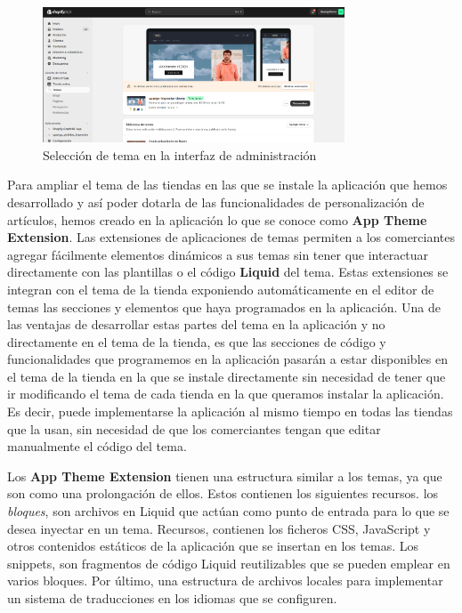 \documentclass[12pt]{article}
\begin{document}
\begin{figure}[ht]
    \centering
    \includegraphics[width=0.8\textwidth]{imagenes/Interfaz de adminsitración elección de tema.png}
    \caption{\label{fig:2}Selección de tema en la interfaz de administración}
    \vspace{\fill}
\end{figure}

Para ampliar el tema de las tiendas en las que se instale la aplicación que hemos desarrollado y así poder dotarla de las funcionalidades de personalización de 
artículos, hemos creado en la aplicación lo que se conoce como \textbf{App Theme Extension}. Las extensiones de aplicaciones de temas permiten a los comerciantes
agregar fácilmente elementos dinámicos a sus temas sin tener que interactuar directamente con las plantillas o el código \textbf{Liquid} del tema. Estas extensiones
se integran con el tema de la tienda exponiendo automáticamente en el editor de temas las secciones y elementos que haya programados en la aplicación. \cite{shopify-dev}
Una de las ventajas de desarrollar estas partes del tema en la aplicación y no directamente en el tema de la tienda, es que las secciones de código y funcionalidades
que programemos en la aplicación pasarán a estar disponibles en el tema de la tienda en la que se instale directamente sin necesidad de tener que ir modificando el tema
de cada tienda en la que queramos instalar la aplicación. Es decir, puede implementarse la aplicación al mismo tiempo en todas las tiendas que la usan,
sin necesidad de que los comerciantes tengan que editar manualmente el código del tema.

Los \textbf{App Theme Extension} tienen una estructura similar a los temas, ya que son como una prolongación de ellos. Estos contienen los siguientes recursos. 
los \textit{bloques}, son archivos en Liquid que actúan como punto de entrada para lo que se desea inyectar en un tema.
Recursos, contienen los ficheros CSS, JavaScript y otros contenidos estáticos de la aplicación que se insertan en los temas.
Los snippets, son fragmentos de código Liquid reutilizables que se pueden emplear en varios bloques. Por último, una estructura de archivos locales
para implementar un sistema de traducciones en los idiomas que se configuren. \cite{shopify-dev}
\end{document}
